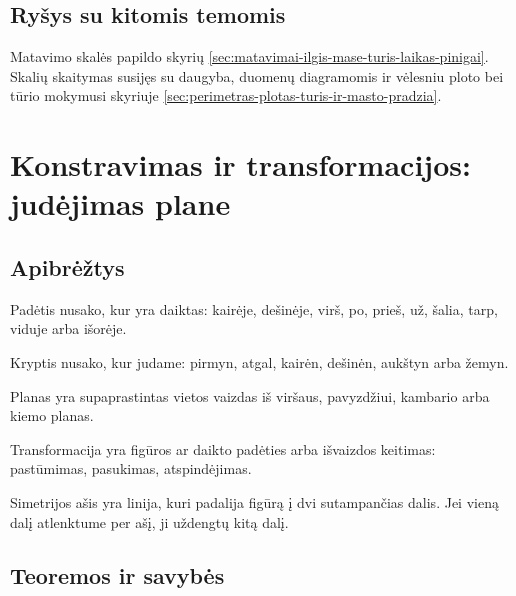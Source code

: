 \subsection{Ryšys su kitomis temomis}

Matavimo skalės papildo skyrių \ref{sec:matavimai-ilgis-mase-turis-laikas-pinigai}. Skalių skaitymas susijęs su daugyba, duomenų diagramomis ir vėlesniu ploto bei tūrio mokymusi skyriuje \ref{sec:perimetras-plotas-turis-ir-masto-pradzia}.

\section{Konstravimas ir transformacijos: judėjimas plane}\label{sec:konstravimas-ir-transformacijos-judejimas-plane}

\subsection{Apibrėžtys}

\begin{apibreztis}
Padėtis nusako, kur yra daiktas: kairėje, dešinėje, virš, po, prieš, už, šalia, tarp, viduje arba išorėje.
\end{apibreztis}

\begin{apibreztis}
Kryptis nusako, kur judame: pirmyn, atgal, kairėn, dešinėn, aukštyn arba žemyn.
\end{apibreztis}

\begin{apibreztis}
Planas yra supaprastintas vietos vaizdas iš viršaus, pavyzdžiui, kambario arba kiemo planas.
\end{apibreztis}

\begin{apibreztis}
Transformacija yra figūros ar daikto padėties arba išvaizdos keitimas: pastūmimas, pasukimas, atspindėjimas.
\end{apibreztis}

\begin{apibreztis}
Simetrijos ašis yra linija, kuri padalija figūrą į dvi sutampančias dalis. Jei vieną dalį atlenktume per ašį, ji uždengtų kitą dalį.
\end{apibreztis}

\subsection{Teoremos ir savybės}

